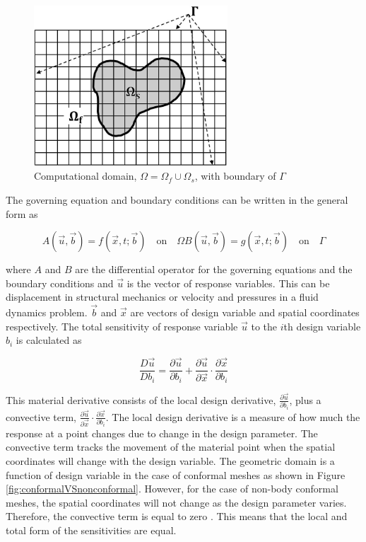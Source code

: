 \documentclass{aiaa-pretty}
\begin{document}
%
\begin{figure}[H]
	\centering
	\includegraphics[height=6.0cm]{figure/domain.jpg}
	\caption{Computational domain, $\Omega = \Omega_f \cup \Omega_s$, with boundary of $\Gamma$}
	\label{fig:domain}
\end{figure}
%

The governing equation and boundary conditions can be written in the general form as

%
\begin{subequations}\label{eq:generalFormForGE}
\begin{equation}
	A(\vec{u}, \vec{b}) = f(\vec{x}, t; \vec{b}) \quad \text{on} \quad \Omega
\end{equation}
\begin{equation}
	B(\vec{u}, \vec{b}) = g(\vec{x}, t; \vec{b}) \quad \text{on} \quad \Gamma
\end{equation}
\end{subequations}
%

where $A$ and $B$ are the differential operator for the governing equations and the boundary conditions and $\vec{u}$ is the vector of response variables. This can be displacement in structural mechanics or velocity and pressures in a fluid dynamics problem. $\vec{b}$ and $\vec{x}$ are vectors of design variable and spatial coordinates respectively. The total sensitivity of response variable $\vec{u}$ to the $i$th design variable $b_i$ is calculated as

%
\begin{equation}
	\frac{D\vec{u}}{Db_i	} = \frac{\partial \vec{u}}{\partial b_i} + 
	                        \frac{\partial \vec{u}}{\partial \vec{x}} \cdot \frac{\partial \vec{x}}{\partial b_i}
\end{equation}
%

This material derivative consists of the local design derivative, $\frac{\partial \vec{u}}{\partial b_i}$, plus a convective term, $\frac{\partial \vec{u}}{\partial \vec{x}} \cdot \frac{\partial \vec{x}}{\partial b_i}$. The local design derivative is a measure of how much the response at a point changes due to change in the design parameter. The convective term tracks the movement of the material point when the spatial coordinates will change with the design variable. The geometric domain is a function of design variable in the case of conformal meshes as shown in Figure \ref{fig:conformalVSnonconformal}. However, for the case of non-body conformal meshes, the spatial coordinates will not change as the design parameter varies. Therefore, the convective term is equal to zero \cite{gobal2014continuum}. This means that the local and total form of the sensitivities are equal.
\end{document}

